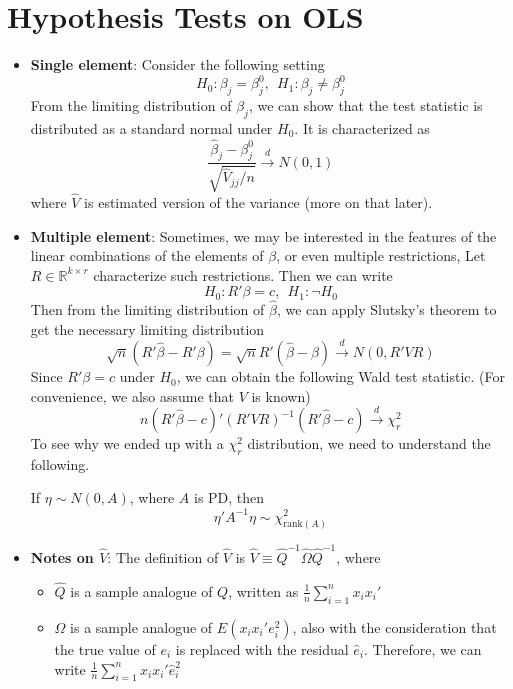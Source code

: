 \section{Hypothesis Tests on OLS}
\begin{itemize}
\item \textbf{Single element}: Consider the following setting
\[
H_0: \beta_j = \beta_j^0, \ \ H_1:\beta_j \neq \beta_j^0
\]
From the limiting distribution of $\beta_j$, we can show that the test statistic is distributed as a standard normal under $H_0$.  It is characterized as
\[
\frac{\hat{\beta}_j-\beta_j^0}{\sqrt{\widehat{V}_{jj}/n}}\xrightarrow{d}N(0,1)
\]
where $\widehat{V}$ is estimated version of the variance (more on that later). 
\item \textbf{Multiple element}: Sometimes, we may be interested in the features of the linear combinations of the elements of $\beta$, or even multiple restrictions, Let $R\in\mathbb{R}^{k\times r}$ characterize such restrictions. Then we can write
\[
H_0 : R'\beta = c, \ \ H_1: \lnot H_0
\]
Then from the limiting distribution of $\hat{\beta}$, we can apply Slutsky's theorem to get the necessary limiting distribution
\[
\sqrt{n}(R'\hat{\beta}-R'\beta)=\sqrt{n}R'(\hat{\beta}-\beta)\xrightarrow{d}N(0,R'VR)
\]
Since $ R'\beta = c$ under $H_0$,  we can obtain the following Wald test statistic. (For convenience, we also assume that $V$ is known)
\[
n(R'\hat{\beta}-c)'(R'VR)^{-1}(R'\hat{\beta}-c)\xrightarrow{d}\chi^2_r
\]
To see why we ended up with a $\chi_r^2$ distribution, we need to understand the following. 
\begin{mdframed}[backgroundcolor=green!5] 
\begin{theorem}
If $\eta\sim N(0,A)$, where $A$ is PD, then 
\[
\eta'A^{-1}\eta\sim \chi^2_{\text{rank}(A)}
\]
\end{theorem}
\end{mdframed} \par
\item \textbf{Notes on $\widehat{V}$}: The definition of $\widehat{V}$ is $\widehat{V}\equiv\widehat{Q}^{-1}\widehat{\Omega}\widehat{Q}^{-1}$, where
\begin{itemize}
\item $\widehat{Q}$ is a sample analogue of $Q$, written as $\frac{1}{n}\sum_{i=1}^nx_ix_i'$
\item $\widehat{\Omega}$ is a sample analogue of $E(x_ix_i'e_i^2)$, also with the consideration that the true value of $e_i$ is replaced with the residual $\hat{e}_i$. Therefore, we can write $\frac{1}{n}\sum_{i=1}^nx_ix_i'\hat{e}_i^2$
\end{itemize}
\end{itemize}

